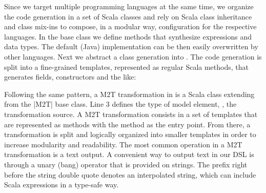 Since we target multiple programming languages at the same time, we organize the code generation in a set of Scala classes and rely on Scala class inheritance and class mix-ins to compose, in a modular way, configuration for the respective languages.
In the base class \href{https://github.com/fikovnik/ttc14-fixml-sigma/blob/master/ttc14-fixml-base/src/fr/inria/spirals/sigma/ttc14/fixml/BaseObjLangMTT.scala}{} we define methods that synthesize expressions and data types.
The default (Java) implementation can be then easily overwritten by other languages.
Next we abstract a class generation into \href{https://github.com/fikovnik/ttc14-fixml-sigma/blob/master/ttc14-fixml-base/src/fr/inria/spirals/sigma/ttc14/fixml/BaseObjLang2Class.scala}{}.
The code generation is split into a fine-grained templates, represented as regular Scala methods, that generates fields, constructors and the like:
%
%
Following the same pattern, a M2T transformation in \SIGMA is a Scala class extending from the \Scala|M2T| base class.
Line 3 defines the type of model element, \Ie, the transformation source.
A M2T transformation consists in a set of templates that are represented as methods with the  method as the entry point.
From there, a transformation is split and logically organized into smaller templates in order to increase modularity and readability.
%
The most common operation in a M2T transformation is a text output.
A convenient way to output text in our DSL is through a unary \Scala{!} (bang) operator that is provided on strings.
The prefix  right before the string double quote denotes an interpolated string, which can include Scala expressions in a type-safe way.

